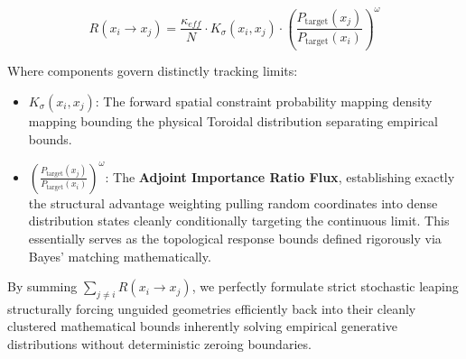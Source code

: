 \documentclass{article}
\begin{document}
\[
R(x_i \to x_j) = \frac{\kappa_{eff}}{N} \cdot K_\sigma(x_i, x_j) \cdot \left(\frac{P_{\text{target}}(x_j)}{P_{\text{target}}(x_i)}\right)^\omega
\]

Where components govern distinctly tracking limits:
\begin{itemize}
    \item \textbf{\(K_\sigma(x_i, x_j)\)}: The forward spatial constraint probability mapping density mapping bounding the physical Toroidal distribution separating empirical bounds.
    \item \textbf{\(\left(\frac{P_{\text{target}}(x_j)}{P_{\text{target}}(x_i)}\right)^\omega\)}: The \textbf{Adjoint Importance Ratio Flux}, establishing exactly the structural advantage weighting pulling random coordinates into dense distribution states cleanly conditionally targeting the continuous limit. This essentially serves as the topological response bounds defined rigorously via Bayes' matching mathematically.
\end{itemize}

By summing \(\sum_{j \ne i} R(x_i \to x_j)\), we perfectly formulate strict stochastic leaping structurally forcing unguided geometries efficiently back into their cleanly clustered mathematical bounds inherently solving empirical generative distributions without deterministic zeroing boundaries.
\end{document}
